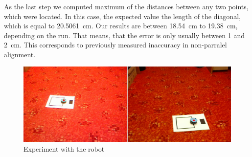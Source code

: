As the last step we computed maximum of the distances between any two points,
which were located. In this case, the expected value the length of the
diagonal, which is equal to 20.5061~cm. Our results are between 18.54~cm to
19.38~cm, depending on the run. That means, that the error is only usually
between 1 and 2~cm. This corresponds to previously measured inaccuracy in
non-parralel alignment.

\begin{figure}
\includegraphics[width=\linewidth]{img/experiments/square-robot.png}
\caption{Experiment with the robot}
\label{fig:robot-square}
\end{figure}

